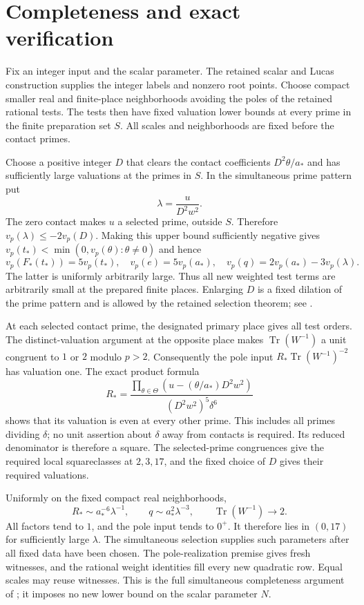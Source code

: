 \documentclass[11pt,a4paper]{article}
\theoremstyle{remark}\newtheorem{remark}[theorem]{Remark}
\DeclareMathOperator{\Tr}{Tr}
\begin{document}
\section{Completeness and exact verification}
Fix an integer input and the scalar parameter. The retained scalar and
Lucas construction supplies the integer labels and nonzero root points.
Choose compact smaller real and finite-place neighborhoods avoiding the
poles of the retained rational tests. The tests then have fixed valuation
lower bounds at every prime in the finite preparation set $S$.
All scales and neighborhoods are fixed before the contact primes.

Choose a positive integer $D$ that clears the contact coefficients
$D^2\theta/a_*$ and has sufficiently large valuations at the primes in
$S$. In the simultaneous prime pattern put
\[
 \lambda=\frac{u}{D^2w^2}.
\]
The zero contact makes $u$ a selected prime, outside $S$. Therefore
$v_p(\lambda)\le-2v_p(D)$. Making this upper bound sufficiently negative
gives $v_p(t_*)<\min(0,v_p(\theta):\theta\ne0)$ and hence
\[
 v_p(F_*(t_*))=5v_p(t_*),\quad
 v_p(e)=5v_p(a_*),\quad
 v_p(q)=2v_p(a_*)-3v_p(\lambda).
\]
The latter is uniformly arbitrarily large. Thus all new weighted test
terms are arbitrarily small at the prepared finite places. Enlarging $D$
is a fixed dilation of the prime pattern and is allowed by the retained
selection theorem; see \cite{Selection}.

At each selected contact prime, the designated primary place gives
all test orders. The distinct-valuation argument at the opposite place
makes $\Tr(W^{-1})$ a unit congruent to $1$ or $2$ modulo $p>2$.
Consequently the pole input $R_*\Tr(W^{-1})^{-2}$ has valuation one.
The exact product formula
\[
 R_*=\frac{\prod_{\theta\in\Theta}(u-(\theta/a_*)D^2w^2)}
               {(D^2w^2)^5\delta^6}
\]
shows that its valuation is even at every other prime. This includes
all primes dividing $\delta$; no unit assertion about $\delta$ away from
contacts is required. Its reduced denominator is therefore a square.
The selected-prime congruences give the required local squareclasses
at $2,3,17$, and the fixed choice of $D$ gives their required valuations.

Uniformly on the fixed compact real neighborhoods,
\[
 R_*\sim a_*^{-6}\lambda^{-1},\qquad q\sim a_*^2\lambda^{-3},
 \qquad \Tr(W^{-1})\longrightarrow2.
\]
All factors tend to $1$, and the pole input tends to $0^+$. It therefore
lies in $(0,17)$ for sufficiently large $\lambda$. The simultaneous
selection supplies such parameters after all fixed data have been chosen.
The pole-realization premise gives fresh witnesses, and the rational
weight identities fill every new quadratic row. Equal scales may reuse
witnesses. This is the full simultaneous completeness argument of
\cite[Proposition 3.2]{Shared}; it imposes no new lower bound on the
scalar parameter $N$.
\end{document}
